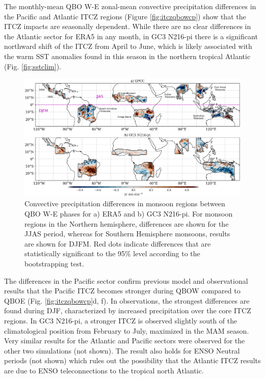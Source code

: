 The monthly-mean QBO W-E zonal-mean convective precipitation differences in the Pacific and Atlantic ITCZ regions (Figure \ref{fig:itczqbowcp}) show that the ITCZ impacts are seasonally dependent.
While there are no clear differences in the Atlantic sector for ERA5 in any month, in GC3 N216-pi there is a significant northward shift of the ITCZ from April to June, which is likely associated with the warm SST anomalies found in this season in the northern tropical Atlantic (Fig. \ref{fig:sstclim}). 

\begin{figure}[t!]
\centering
 \includegraphics[width=\linewidth]{figures/monsoon_gpcc_qbow.png}
\caption[Global monsoon impacts of the QBO.]{ Convective precipitation differences in monsoon regions between QBO W-E  phases for a) ERA5 and b) GC3 N216-pi. For monsoon regions in the Northern hemisphere, differences are shown for the JJAS period, whereas for Southern Hemisphere monsoons, results are shown for DJFM.  Red dots indicate differences that are statistically significant to the 95\% level according to the bootstrapping test.}
\label{fig:mons_map}
\end{figure}

 The differences in the Pacific sector confirm previous model and observational results \citep{gray2018,serva2021} that the Pacific ITCZ becomes stronger during QBOW compared to QBOE (Fig. \ref{fig:itczqbowcp}d, f). In observations, the strongest differences are found during DJF, characterized by increased precipitation over the core ITCZ regions. In GC3 N216-pi, a stronger ITCZ is observed slightly south of the climatological position from February to July, maximized in the MAM season. Very similar results for the Atlantic and Pacific sectors were observed for the other two simulations (not shown). The result also holds for ENSO Neutral periods (not shown) which rules out the possibility that the Atlantic ITCZ results are due to ENSO teleconnections to the tropical north Atlantic. 


